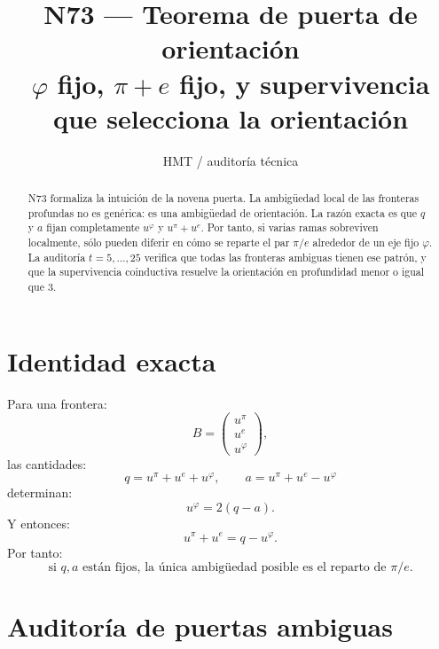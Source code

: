 \documentclass[11pt,a4paper]{article}
\title{\bfseries N73 --- Teorema de puerta de orientación\\
\large \(\varphi\) fijo, \(\pi+e\) fijo, y supervivencia que selecciona la orientación}
\author{HMT / auditoría técnica}
\date{}
\begin{document}
\maketitle

\begin{abstract}
N73 formaliza la intuición de la novena puerta. La ambigüedad local de las fronteras profundas no es genérica: es una ambigüedad de orientación. La razón exacta es que \(q\) y \(a\) fijan completamente \(u^\varphi\) y \(u^\pi+u^e\). Por tanto, si varias ramas sobreviven localmente, sólo pueden diferir en cómo se reparte el par \(\pi/e\) alrededor de un eje fijo \(\varphi\). La auditoría \(t=5,\ldots,25\) verifica que todas las fronteras ambiguas tienen ese patrón, y que la supervivencia coinductiva resuelve la orientación en profundidad menor o igual que \(3\).
\end{abstract}

\section{Identidad exacta}

Para una frontera:
\[
B=
\begin{pmatrix}
u^\pi\\u^e\\u^\varphi
\end{pmatrix},
\]
las cantidades:
\[
q=u^\pi+u^e+u^\varphi,
\qquad
a=u^\pi+u^e-u^\varphi
\]
determinan:
\[
\boxed{
u^\varphi = 2(q-a).
}
\]
Y entonces:
\[
\boxed{
u^\pi+u^e = q-u^\varphi.
}
\]
Por tanto:
\[
\boxed{
\text{si }q,a\text{ están fijos, la única ambigüedad posible es el reparto de }\pi/e.
}
\]

\section{Auditoría de puertas ambiguas}
\end{document}
